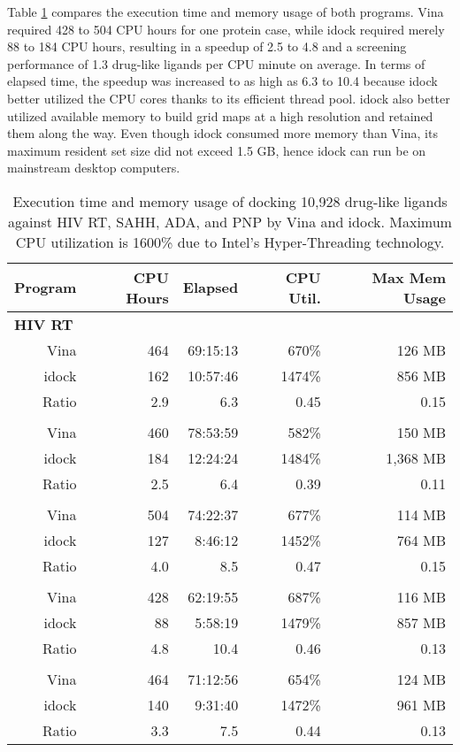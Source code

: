 \documentclass[10pt,conference,compsocconf]{../IEEEtran}
\begin{document}
Table \ref{tab:ExecutionTimeAndMemoryUsage} compares the execution time and memory usage of both programs. Vina required 428 to 504 CPU hours for one protein case, while idock required merely 88 to 184 CPU hours, resulting in a speedup of 2.5 to 4.8 and a screening performance of 1.3 drug-like ligands per CPU minute on average. In terms of elapsed time, the speedup was increased to as high as 6.3 to 10.4 because idock better utilized the CPU cores thanks to its efficient thread pool. idock also better utilized available memory to build grid maps at a high resolution and retained them along the way. Even though idock consumed more memory than Vina, its maximum resident set size did not exceed 1.5 GB, hence idock can run be on mainstream desktop computers.

\begin{table}
\centering
\begin{tabular*}
{\linewidth}
{@{\extracolsep{\fill}}rrrrr}
\toprule
Program & CPU Hours & Elapsed & CPU Util. & Max Mem Usage\\
\midrule
\multicolumn{5}{l}{\textbf{HIV RT}}\\
Vina  & 464 & 69:15:13 &  670\% & 126 MB\\
idock & 162 & 10:57:46 & 1474\% & 856 MB\\
Ratio & 2.9 &      6.3 & 0.45   & 0.15\\
\noalign{\smallskip\smallskip}
\multicolumn{5}{l}{\textbf{SAHH}}\\
Vina  & 460 & 78:53:59 &  582\% &   150 MB\\
idock & 184 & 12:24:24 & 1484\% & 1,368 MB\\
Ratio & 2.5 &      6.4 &  0.39  & 0.11\\
\noalign{\smallskip\smallskip}
\multicolumn{5}{l}{\textbf{ADA}}\\
Vina  & 504 & 74:22:37 &  677\% & 114 MB\\
idock & 127 &  8:46:12 & 1452\% & 764 MB\\
Ratio & 4.0 &      8.5 &  0.47  & 0.15\\
\noalign{\smallskip\smallskip}
\multicolumn{5}{l}{\textbf{PNP}}\\
Vina  & 428 & 62:19:55 &  687\% & 116 MB\\
idock &  88 &  5:58:19 & 1479\% & 857 MB\\
Ratio & 4.8 &     10.4 &  0.46  & 0.13\\
\noalign{\smallskip\smallskip}
\multicolumn{5}{l}{\textbf{Average}}\\
Vina  & 464 & 71:12:56 &  654\% & 124 MB\\
idock & 140 &  9:31:40 & 1472\% & 961 MB\\
Ratio & 3.3 &      7.5 & 0.44   & 0.13\\
\bottomrule
\end{tabular*}
\caption{Execution time and memory usage of docking 10,928 drug-like ligands against HIV RT, SAHH, ADA, and PNP by Vina and idock. Maximum CPU utilization is 1600\% due to Intel's Hyper-Threading technology.}
\label{tab:ExecutionTimeAndMemoryUsage}
\end{table}
\end{document}
